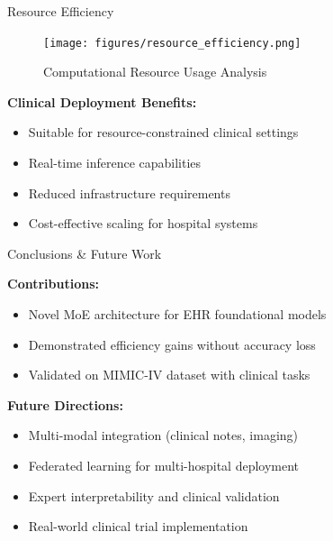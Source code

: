 \documentclass[final]{beamer}
\newlength{\colwidth}
\begin{document}
\begin{frame}[t]
\begin{columns}[t]
\begin{column}{\colwidth}
\begin{block}{Resource Efficiency}
    \begin{figure}
        \centering
        \texttt{[image: figures/resource\_efficiency.png]}
        \caption{Computational Resource Usage Analysis}
        \label{fig:resources}
    \end{figure}

    \textbf{Clinical Deployment Benefits:}
    \begin{itemize}
        \item Suitable for resource-constrained clinical settings
        \item Real-time inference capabilities
        \item Reduced infrastructure requirements
        \item Cost-effective scaling for hospital systems
    \end{itemize}
    
  \end{block}

  \begin{block}{Conclusions \& Future Work}
    
    \textbf{Contributions:}
    \begin{itemize}
        \item Novel MoE architecture for EHR foundational models
        \item Demonstrated efficiency gains without accuracy loss
        \item Validated on MIMIC-IV dataset with clinical tasks
    \end{itemize}

    \textbf{Future Directions:}
    \begin{itemize}
        \item Multi-modal integration (clinical notes, imaging)
        \item Federated learning for multi-hospital deployment
        \item Expert interpretability and clinical validation
        \item Real-world clinical trial implementation
    \end{itemize}
    
  \end{block}
        



\end{column}
\end{columns}
\end{frame}
\end{document}
